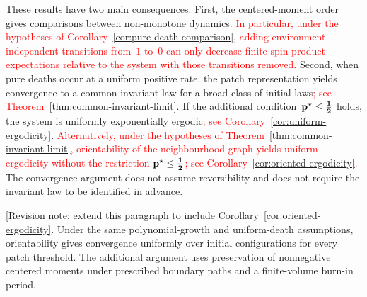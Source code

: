 %
%
%

These results have two main consequences. First, the centered-moment order gives
comparisons between non-monotone dynamics. \textcolor{red}{In particular,
under the hypotheses of Corollary~\ref{cor:pure-death-comparison}, adding
environment-independent transitions from~$1$ to~$0$ can only decrease finite
spin-product expectations relative to the system with those transitions
removed.}  Second, when pure deaths occur at a uniform positive rate, the patch
representation yields convergence to a common invariant law for a broad class
of initial laws\textcolor{red}{; see
Theorem~\ref{thm:common-invariant-limit}}. If the additional
condition~$\mathbf{p}^\star\leq \boldsymbol{\frac{1}{2}}$ holds, the system is uniformly
exponentially ergodic\textcolor{red}{; see
Corollary~\ref{cor:uniform-ergodicity}}.  \textcolor{red}{Alternatively, under
the hypotheses of Theorem~\ref{thm:common-invariant-limit}, orientability of
the neighbourhood graph yields uniform ergodicity without the restriction
$\mathbf{p}^\star\leq\boldsymbol{\frac12}$; see
Corollary~\ref{cor:oriented-ergodicity}.} The convergence argument does not
assume reversibility and does not require the invariant law to be identified in
advance.

\textcolor{revisionpurple}{[Revision note: extend this paragraph to include
Corollary~\ref{cor:oriented-ergodicity}. Under the same polynomial-growth
and uniform-death assumptions, orientability gives convergence uniformly
over initial configurations for every patch threshold.
The additional argument uses preservation of nonnegative centered moments
under prescribed boundary paths and a finite-volume burn-in period.]}

